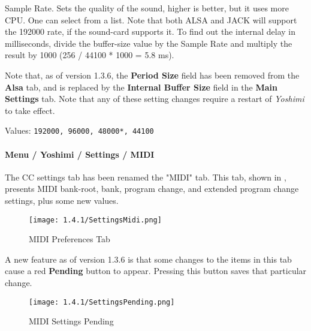    Sample Rate.
   Sets the quality of the sound, higher is better, but it uses more CPU.  One
   can select from a list.  Note that both ALSA and JACK will support the
   192000 rate, if the sound-card supports it.  To find out the internal delay
   in milliseconds, divide the buffer-size value by the Sample Rate and
   multiply the result by 1000 (256 / 44100 * 1000 = 5.8 ms).

   Note that, as of version 1.3.6, the \textbf{Period Size} field has been
   removed from the \textbf{Alsa} tab, and is replaced by the 
   \textbf{Internal Buffer Size} field in the \textbf{Main Settings} tab.
   Note that any of these setting changes require a restart of \textsl{Yoshimi}
   to take effect.
   

   Values: \texttt{192000, 96000, 48000*, 44100}

\paragraph{Menu / Yoshimi / Settings / MIDI}
\label{paragraph:menu_yoshimi_settings_ccs}

   The CC settings tab has been renamed the "MIDI" tab.
   This tab, shown in
   ,
   presents MIDI bank-root, bank, program change, and extended program
   change settings, plus some new values.

\begin{figure}[H]
   \centering 
   \texttt{[image: 1.4.1/SettingsMidi.png]}
   \caption[MIDI Preferences]{MIDI Preferences Tab}
   \label{fig:yoshimi_settings_cc}
\end{figure}

   A new feature as of version 1.3.6 is that some changes to the items in this
   tab cause a red \textbf{Pending} button to appear.  Pressing this
   button saves that particular change.

\begin{figure}[H]
   \centering 
   \texttt{[image: 1.4.1/SettingsPending.png]}
   \caption[MIDI Settings Pending]{MIDI Settings Pending}
   \label{fig:yoshimi_settings_pending}
\end{figure}

